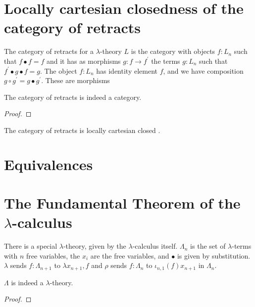 \section{Locally cartesian closedness of the category of retracts}
\begin{definition}
  The category of retracts for a $ \lambda $-theory $ L $ is the category with objects $ f: L_n $ such that $ f \bullet f = f $ and it has as morphisms $ g: f \to f^\prime $ the terms $ g: L_n $ such that $ f^\prime \bullet g \bullet f = g $. The object $ f: L_n $ has identity element $ f $, and we have composition $ g \circ g^\prime = g \bullet g^\prime $. These are morphisms \TODO
\end{definition}

\begin{lemma}
  The category of retracts is indeed a category.
\end{lemma}
\begin{proof}
  \TODO
\end{proof}

\begin{theorem}
  The category of retracts is locally cartesian closed \TODO.
\end{theorem}

\section{Equivalences}

\section{The Fundamental Theorem of the \texorpdfstring{$ \lambda $-}{lambda }calculus}

\begin{definition}[$ \Lambda $]
  There is a special $ \lambda $-theory, given by the $ \lambda $-calculus itself. $ \Lambda_n $ is the set of $ \lambda $-terms with $ n $ free variables, the $ x_i $ are the free variables, and $ \bullet $ is given by substitution. $ \lambda $ sends $ f: \Lambda_{n + 1} $ to $ \lambda x_{n + 1}, f $ and $ \rho $ sends $ f: \Lambda_n $ to $ \iota_{n, 1}(f) x_{n + 1} $ in $ \Lambda_n $.
\end{definition}

\begin{lemma}
  $ \Lambda $ is indeed a $ \lambda $-theory.
\end{lemma}
\begin{proof}
  \TODO
\end{proof}


